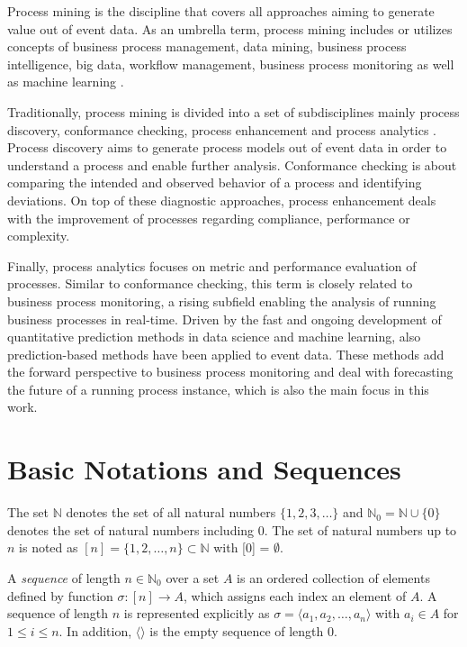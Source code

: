 Process mining is the discipline that covers all approaches aiming to generate value out of event data.
As an umbrella term, process mining includes or utilizes concepts of business process management, data mining, business process intelligence, big data, workflow management, business process monitoring \cite{DBLP:books/sp/Aalst16} as well as machine learning \cite{DBLP:conf/bpm/VeitGMHT17}.

Traditionally, process mining is divided into a set of subdisciplines mainly process discovery, conformance checking, process enhancement and process analytics \cite{DBLP:conf/caise/EckLLA15}.
Process discovery aims to generate process models out of event data in order to understand a process and enable further analysis.
Conformance checking is about comparing the intended and observed behavior of a process and identifying deviations.
On top of these diagnostic approaches, process enhancement deals with the improvement of processes regarding compliance, performance or complexity.

Finally, process analytics focuses on metric and performance evaluation of processes. Similar to conformance checking, this term is closely related to business process monitoring, a rising subfield enabling the analysis of running business processes in real-time.
Driven by the fast and ongoing development of quantitative prediction methods in data science and machine learning, also prediction-based methods have been applied to event data.
These methods add the forward perspective to business process monitoring and deal with forecasting the future of a running process instance, which is also the main focus in this work.


\section{Basic Notations and Sequences}

The set $\mathbb{N}$ denotes the set of all natural numbers $\{1, 2, 3, \dots\}$ and $\mathbb{N}_0 = \mathbb{N} \cup \{0\}$ denotes the set of natural numbers including 0.
The set of natural numbers up to $n$ is noted as $[n] = \{1, 2, \dots, n\} \subset \mathbb{N}$ with [0] = $\emptyset$.

\begin{definition}[Sequence]
		A \textit{sequence} of length $n \in \mathbb{N}_0$ over a set $A$ is an ordered collection of elements defined by function $\sigma \colon [n]\to A$, which assigns each index an element of $A$.
		A sequence  of length $n$ is represented explicitly as $\sigma = \langle a_1, a_2, \dots, a_n\rangle $ with $a_i \in A$ for $1 \leq i \leq n$. In addition, $\langle \rangle$ is the empty sequence of length $0$.
\end{definition}

